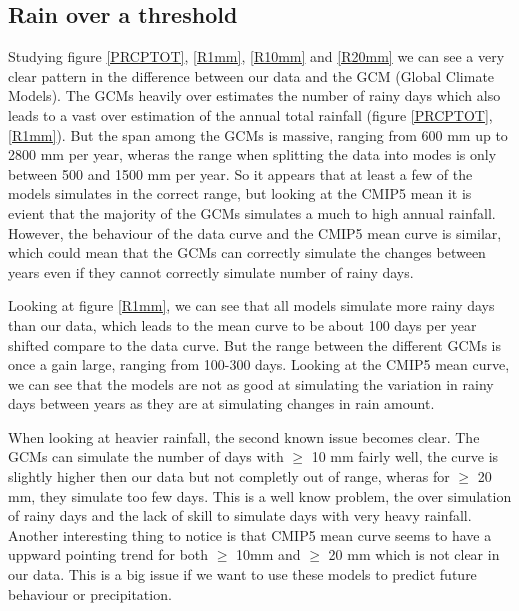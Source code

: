 \documentclass{article}
\begin{document}
	\subsection{Rain over a threshold}
	Studying figure \ref{PRCPTOT}, \ref{R1mm}, \ref{R10mm} and \ref{R20mm} we can see a very clear pattern in the difference between our data and the GCM (Global Climate Models). The GCMs heavily over estimates the number of rainy days which also leads to a vast over estimation of the annual total rainfall (figure \ref{PRCPTOT}, \ref{R1mm}). But the span among the GCMs is massive, ranging from 600 mm up to 2800 mm per year, wheras the range when splitting the data into modes is only between 500 and 1500 mm per year. So it appears that at least a few of the models simulates in the correct range, but looking at the CMIP5 mean it is evient that the majority of the GCMs simulates a much to high annual rainfall. However, the behaviour of the data curve and the CMIP5 mean curve is similar, which could mean that the GCMs can correctly simulate the changes between years even if they cannot correctly  simulate number of rainy days.
	
	Looking at figure \ref{R1mm}, we can see that all models simulate more rainy days than our data, which leads to the mean curve to be about 100 days per year shifted compare to the data curve. But the range between the different GCMs is once a gain large, ranging from 100-300 days. Looking at the CMIP5 mean curve, we can see that the models are not as good at simulating the variation in rainy days between years as they are at simulating changes in rain amount. 
	
	When looking at heavier rainfall, the second known issue becomes clear. The GCMs can simulate the number of days with $\geq$ 10 mm fairly well, the curve is slightly higher then our data but not completly out of range, wheras for $\geq$ 20 mm, they simulate too few days. This is a well know problem, the over simulation of rainy days and the lack of skill to simulate days with very heavy rainfall. Another interesting thing to notice is that CMIP5 mean curve seems to have a uppward pointing trend for both $\geq$ 10mm and $\geq$ 20 mm which is not clear in our data. This is a big issue if we want to use these models to predict future behaviour or precipitation. 
	
\end{document}
